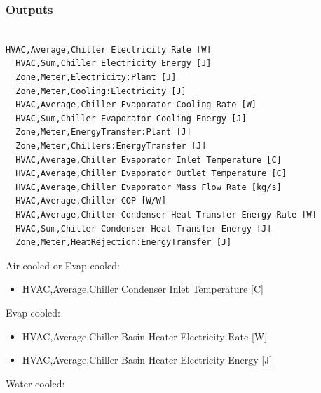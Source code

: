\subsubsection{Outputs}\label{outputs-6-006}

\begin{lstlisting}

HVAC,Average,Chiller Electricity Rate [W]
  HVAC,Sum,Chiller Electricity Energy [J]
  Zone,Meter,Electricity:Plant [J]
  Zone,Meter,Cooling:Electricity [J]
  HVAC,Average,Chiller Evaporator Cooling Rate [W]
  HVAC,Sum,Chiller Evaporator Cooling Energy [J]
  Zone,Meter,EnergyTransfer:Plant [J]
  Zone,Meter,Chillers:EnergyTransfer [J]
  HVAC,Average,Chiller Evaporator Inlet Temperature [C]
  HVAC,Average,Chiller Evaporator Outlet Temperature [C]
  HVAC,Average,Chiller Evaporator Mass Flow Rate [kg/s]
  HVAC,Average,Chiller COP [W/W]
  HVAC,Average,Chiller Condenser Heat Transfer Energy Rate [W]
  HVAC,Sum,Chiller Condenser Heat Transfer Energy [J]
  Zone,Meter,HeatRejection:EnergyTransfer [J]
\end{lstlisting}

Air-cooled or Evap-cooled:

\begin{itemize}
    \tightlist
    \item
    HVAC,Average,Chiller Condenser Inlet Temperature {[}C{]}
\end{itemize}

Evap-cooled:

\begin{itemize}
    \item
    HVAC,Average,Chiller Basin Heater Electricity Rate {[}W{]}
    \item
    HVAC,Average,Chiller Basin Heater Electricity Energy {[}J{]}
\end{itemize}

Water-cooled:

